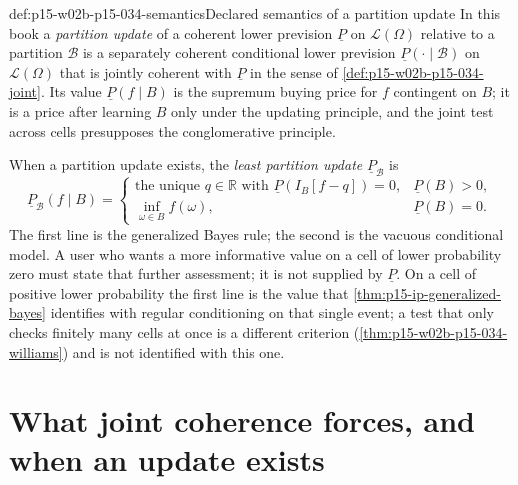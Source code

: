 \begin{hbconvention}{def:p15-w02b-p15-034-semantics}{Declared semantics of a partition update}
In this book a \emph{partition update} of a coherent lower prevision
\(\underline P\) on \(\mathcal L(\Omega)\) relative to a partition
\(\mathcal B\) is a separately coherent conditional lower prevision
\(\underline P(\cdot\mid\mathcal B)\) on \(\mathcal L(\Omega)\) that is
jointly coherent with \(\underline P\) in the sense of
\cref{def:p15-w02b-p15-034-joint}. Its value \(\underline P(f\mid B)\) is
the supremum buying price for \(f\) contingent on \(B\); it is a price
after learning \(B\) only under the updating principle, and the joint test
across cells presupposes the conglomerative principle.

When a partition update exists, the \emph{least partition update}
\(\underline P_{\mathcal B}\) is
\[
 \underline P_{\mathcal B}(f\mid B)=
 \begin{cases}
  \text{the unique }q\in\mathbb R\text{ with }\underline P(I_B[f-q])=0,
                    &\underline P(B)>0,\\[2pt]
  \inf_{\omega\in B}f(\omega), &\underline P(B)=0.
 \end{cases}
\]
The first line is the generalized Bayes rule; the second is the vacuous
conditional model. A user who wants a more informative value on a cell of
lower probability zero must state that further assessment; it is not
supplied by \(\underline P\). On a cell of positive lower probability
the first line is the value that \cref{thm:p15-ip-generalized-bayes}
identifies with regular conditioning on that single event; a test that only
checks finitely many cells at once is a different criterion
(\cref{thm:p15-w02b-p15-034-williams}) and is not identified with this one.
\end{hbconvention}

\section{What joint coherence forces, and when an update exists}
\label{sec:p15-w02b-p15-034-results}

